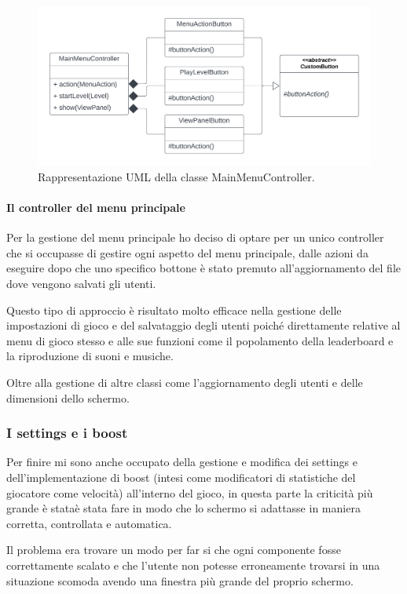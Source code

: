 \documentclass[a4paper,12pt]{report}
\begin{document}
\begin{figure}[H]
\centering{}
\includegraphics[scale=0.8] {img/menu-controller.png}
\caption{Rappresentazione UML della classe MainMenuController.}
\label{img:menu-controller}
\end{figure}

\paragraph{Il controller del menu principale} Per la gestione del menu principale ho deciso di optare per un unico controller che si occupasse di gestire ogni aspetto del menu principale, dalle azioni da eseguire dopo che uno specifico bottone è stato premuto all’aggiornamento del file dove vengono salvati gli utenti. 

Questo tipo di approccio è risultato molto efficace nella gestione delle impostazioni di gioco e del salvataggio degli utenti poiché direttamente relative al menu di gioco stesso e alle sue funzioni come il popolamento della leaderboard e la riproduzione di suoni e musiche. 

Oltre alla gestione di altre classi come l’aggiornamento degli utenti e delle dimensioni dello schermo.

\subsubsection{I settings e i boost}

Per finire mi sono anche occupato della gestione e modifica dei settings e dell’implementazione di boost (intesi come modificatori di statistiche del giocatore come velocità) all’interno del gioco, in questa parte la criticità più grande è  stataè stata fare in modo che lo schermo si adattasse in maniera corretta, controllata e automatica. 

Il problema era trovare un modo per far si che ogni componente fosse correttamente scalato e che l’utente non potesse erroneamente trovarsi in una situazione scomoda avendo una finestra più grande del proprio schermo. 
\end{document}
